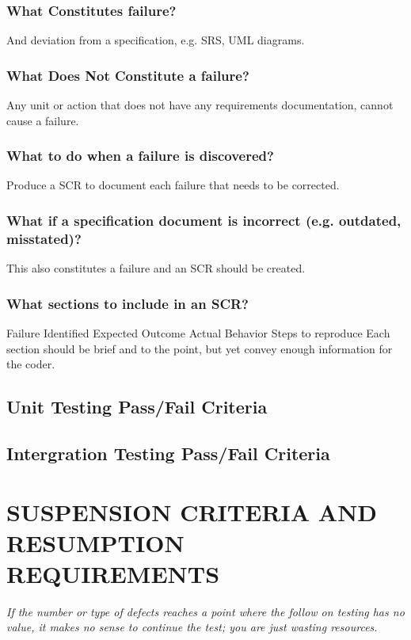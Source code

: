 {{\subsubsection{What Constitutes failure?}
And deviation from a specification, e.g. SRS, UML diagrams.

\subsubsection{What Does Not Constitute a failure?}
Any unit or action that does not have any requirements documentation, cannot cause a failure.

\subsubsection{What to do when a failure is discovered?}
Produce a SCR to document each failure that needs to be corrected.

\subsubsection{What if a specification document is incorrect (e.g. outdated, misstated)?}
This also constitutes a failure and an SCR should be created.

\subsubsection{What sections to include in an SCR?}
Failure Identified 
\newline
Expected Outcome 
\newline
Actual Behavior 
\newline
Steps to reproduce
\newline
Each section should be brief and to the point, but yet convey enough information for the coder.

\subsection{Unit Testing Pass/Fail Criteria}

\subsection{Intergration Testing Pass/Fail Criteria}




}

\section[SUSPENSION CRITERIA]{\bfseries\color{black}
	 SUSPENSION CRITERIA AND RESUMPTION REQUIREMENTS}
{\itshape\color{black}
If the number or type of defects reaches a point where the follow on
testing has no value, it makes no sense to continue the test; you are
just wasting resources.

}}
